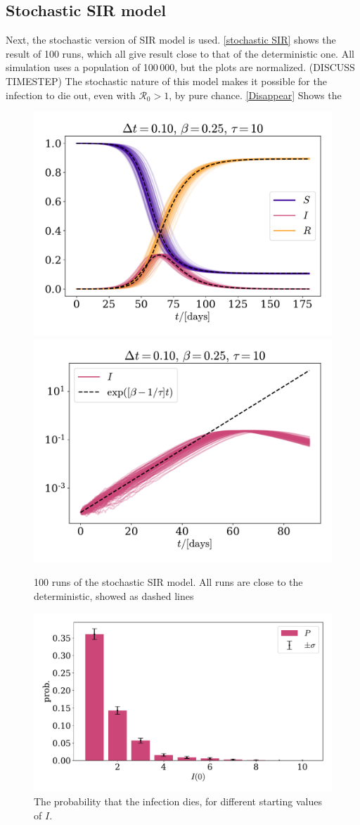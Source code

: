 \documentclass{article}
\begin{document}
    \subsection*{Stochastic SIR model}
    Next, the stochastic version of SIR model is used. \autoref{stochastic SIR} shows the result of 100 runs, which all give result close to that of the deterministic one. All simulation uses a population of 100\,000, but the plots are normalized. (DISCUSS TIMESTEP) The stochastic nature of this model makes it possible for the infection to die out, even with $\mathcal{R}_0>1$, by pure chance. \autoref{Disappear} Shows the 

    \begin{figure}
        \centering
        \includegraphics[width=.49\textwidth]{../plots/2B/TestSIR_stoch.pdf}
        \includegraphics[width=.49\textwidth]{../plots/2B/TestI_stoch.pdf}
        \caption{100 runs of the stochastic SIR model. All runs are close to the deterministic, showed as dashed lines}
        \label{stochastic SIR}
    \end{figure}

    \begin{figure}
        \centering
        \includegraphics[width=.7\textwidth]{../plots/2B/disappear.pdf}
        \caption{The probability that the infection dies, for different starting values of $I$.}
        \label{Disappear}
    \end{figure}

    \printbibliography
\end{document}
